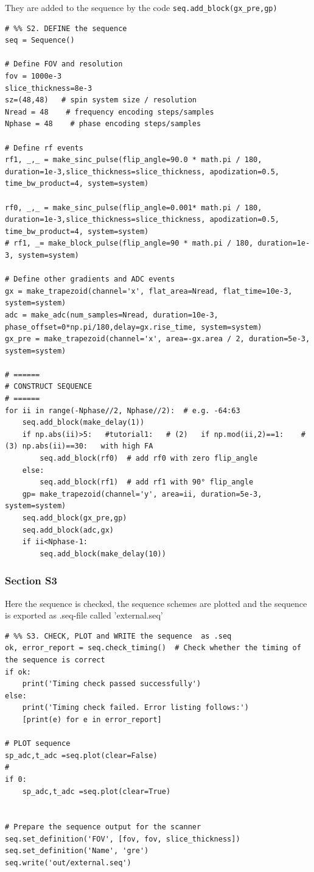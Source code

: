 \documentclass[a4paper,12pt]{extarticle}
\begin{document}
They are added to the sequence by the code \texttt{seq.add_block(gx_pre,gp)}


\begin{verbatim}
# %% S2. DEFINE the sequence 
seq = Sequence()

# Define FOV and resolution
fov = 1000e-3 
slice_thickness=8e-3
sz=(48,48)   # spin system size / resolution
Nread = 48    # frequency encoding steps/samples
Nphase = 48    # phase encoding steps/samples

# Define rf events
rf1, _,_ = make_sinc_pulse(flip_angle=90.0 * math.pi / 180, duration=1e-3,slice_thickness=slice_thickness, apodization=0.5, time_bw_product=4, system=system)

rf0, _,_ = make_sinc_pulse(flip_angle=0.001* math.pi / 180, duration=1e-3,slice_thickness=slice_thickness, apodization=0.5, time_bw_product=4, system=system)
# rf1, _= make_block_pulse(flip_angle=90 * math.pi / 180, duration=1e-3, system=system)

# Define other gradients and ADC events
gx = make_trapezoid(channel='x', flat_area=Nread, flat_time=10e-3, system=system)
adc = make_adc(num_samples=Nread, duration=10e-3, phase_offset=0*np.pi/180,delay=gx.rise_time, system=system)
gx_pre = make_trapezoid(channel='x', area=-gx.area / 2, duration=5e-3, system=system)

# ======
# CONSTRUCT SEQUENCE
# ======
for ii in range(-Nphase//2, Nphase//2):  # e.g. -64:63
    seq.add_block(make_delay(1))
    if np.abs(ii)>5:   #tutorial1:   # (2)   if np.mod(ii,2)==1:    #(3) np.abs(ii)==30:   with high FA
        seq.add_block(rf0)  # add rf0 with zero flip_angle 
    else:
        seq.add_block(rf1)  # add rf1 with 90° flip_angle 
    gp= make_trapezoid(channel='y', area=ii, duration=5e-3, system=system)
    seq.add_block(gx_pre,gp)
    seq.add_block(adc,gx)
    if ii<Nphase-1:
        seq.add_block(make_delay(10))
\end{verbatim}

\subsubsection{Section S3}
Here the sequence is checked, the sequence schemes are plotted and the sequence is exported as .seq-file called 'external.seq'
\begin{verbatim}
# %% S3. CHECK, PLOT and WRITE the sequence  as .seq
ok, error_report = seq.check_timing()  # Check whether the timing of the sequence is correct
if ok:
    print('Timing check passed successfully')
else:
    print('Timing check failed. Error listing follows:')
    [print(e) for e in error_report]

# PLOT sequence
sp_adc,t_adc =seq.plot(clear=False)
#   
if 0:
    sp_adc,t_adc =seq.plot(clear=True)


# Prepare the sequence output for the scanner
seq.set_definition('FOV', [fov, fov, slice_thickness])
seq.set_definition('Name', 'gre')
seq.write('out/external.seq')
\end{verbatim}
\end{document}

